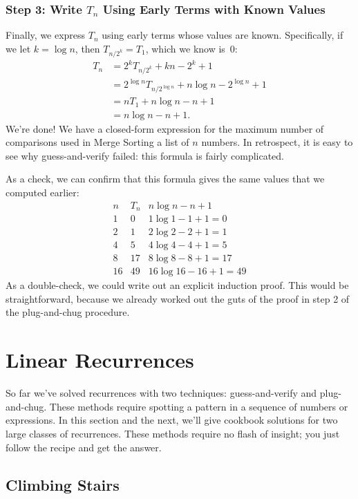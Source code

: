 \subsubsection*{Step 3:  Write $T_n$ Using Early Terms with Known Values}

Finally, we express $T_n$ using early terms whose values are known.
Specifically, if we let $k = \log n$, then $T_{n/2^k} = T_1$, which we
know is~0:
\begin{align*}
T_n & = 2^k T_{n/2^k} + kn - 2^k + 1 \\
  & = 2^{\log n} T_{n/2^{\log n}} + n \log n - 2^{\log n} + 1 \\
  & = n T_1 + n \log n - n + 1 \\
  & = n \log n - n + 1.
\end{align*}
We're done!  We have a closed-form expression for the maximum number
of comparisons used in Merge Sorting a list of $n$ numbers.  In
retrospect, it is easy to see why guess-and-verify failed:  this
formula is fairly complicated.

As a check, we can confirm that this formula gives the same values
that we computed earlier:
\[
\begin{array}{c|c|c}
n & T_n & n \log n - n + 1 \\ \hline
1 & 0 & 1 \log 1 - 1 + 1 = 0 \\
2 & 1 & 2 \log 2 - 2 + 1 = 1 \\
4 & 5 & 4 \log 4 - 4 + 1 = 5 \\
8 & 17 & 8 \log 8 - 8 + 1 = 17 \\
16 & 49 & 16 \log 16 - 16 + 1 = 49
\end{array}
\]
As a double-check, we could write out an explicit induction proof.
This would be straightforward, because we already worked out the guts
of the proof in step 2 of the plug-and-chug procedure.

\section{Linear Recurrences}

So far we've solved recurrences with two techniques: guess-and-verify
and plug-and-chug.  These methods require spotting a pattern in a
sequence of numbers or expressions.  In this section and the next,
we'll give cookbook solutions for two large classes of recurrences.
These methods require no flash of insight; you just follow the recipe
and get the answer.

\subsection{Climbing Stairs}

